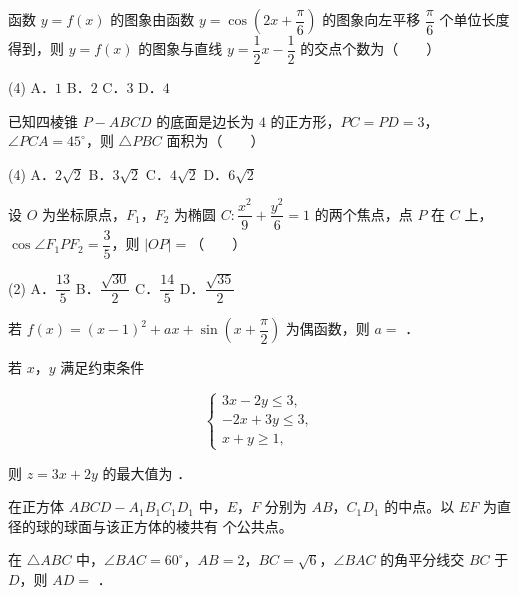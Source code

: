 \begin{question}
函数 $y=f(x)$ 的图象由函数 $y=\cos\left(2x+\dfrac\pi6\right)$ 的图象向左平移 $\dfrac\pi6$ 个单位长度得到，则 $y=f(x)$ 的图象与直线 $y=\dfrac12x-\dfrac12$ 的交点个数为\mbox{（　　）}

\begin{gkopts}(4)
\task A．$1$
\task B．$2$
\task C．$3$
\task D．$4$
\end{gkopts}

\end{question}
\begin{question}
已知四棱锥 $P-ABCD$ 的底面是边长为 $4$ 的正方形，$PC=PD=3$，$\angle PCA=45^\circ$，则 $\triangle PBC$ 面积为\mbox{（　　）}

\begin{gkopts}(4)
\task A．$2\sqrt2$
\task B．$3\sqrt2$
\task C．$4\sqrt2$
\task D．$6\sqrt2$
\end{gkopts}

\end{question}
\begin{question}
设 $O$ 为坐标原点，$F_1$，$F_2$ 为椭圆 $C:\dfrac{x^2}{9}+\dfrac{y^2}{6}=1$ 的两个焦点，点 $P$ 在 $C$ 上，$\cos\angle F_1PF_2=\dfrac35$，则 $|OP|=$\mbox{（　　）}

\begin{gkopts}(2)
\task A．$\dfrac{13}{5}$
\task B．$\dfrac{\sqrt{30}}2$
\task C．$\dfrac{14}{5}$
\task D．$\dfrac{\sqrt{35}}2$
\end{gkopts}

\par\medskip

\end{question}

\begin{question}
若 $f(x)=(x-1)^2+ax+\sin\left(x+\dfrac\pi2\right)$ 为偶函数，则 $a=$ \gkblank{}．

\end{question}
\begin{question}
若 $x$，$y$ 满足约束条件

\nopagebreak[4]
\[
\begin{cases}
3x-2y\leqslant3,\\
-2x+3y\leqslant3,\\
x+y\geqslant1,
\end{cases}
\]

则 $z=3x+2y$ 的最大值为 \gkblank{}．

\end{question}
\begin{question}
在正方体 $ABCD-A_1B_1C_1D_1$ 中，$E$，$F$ 分别为 $AB$，$C_1D_1$ 的中点。以 $EF$ 为直径的球的球面与该正方体的棱共有 \gkblank{} 个公共点。

\end{question}
\begin{question}
在 $\triangle ABC$ 中，$\angle BAC=60^\circ$，$AB=2$，$BC=\sqrt6$，$\angle BAC$ 的角平分线交 $BC$ 于 $D$，则 $AD=$ \gkblank{}．

\par\medskip

\end{question}

